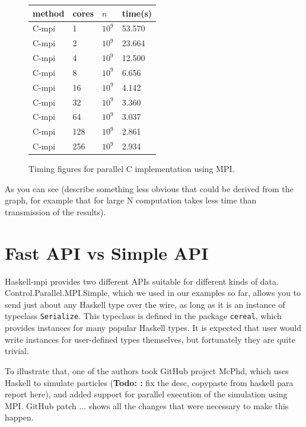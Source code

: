 \documentclass{tmr}
\newcommand{\Todo}[1]{{\textbf{Todo: #1}}}
\begin{document}
\begin{figure}
\begin{center}
\begin{tabular}{|l|l|l|l|} \hline
method & cores & $n$ & time(s) \\ \hline\hline
C-mpi & 1   & $10^9$ & 53.570 \\ \hline
C-mpi & 2   & $10^9$ & 23.664  \\ \hline
C-mpi & 4   & $10^9$ & 12.500 \\ \hline
C-mpi & 8   & $10^9$ & 6.656 \\ \hline
C-mpi & 16  & $10^9$ & 4.142 \\ \hline
C-mpi & 32 & $10^9$ & 3.360 \\ \hline
C-mpi & 64   & $10^9$ & 3.037 \\ \hline
C-mpi & 128   & $10^9$ & 2.861 \\ \hline
C-mpi & 256 & $10^9$ & 2.934 \\ \hline
\end{tabular}
\end{center}
\caption{Timing figures for parallel C implementation using MPI.\label{CTiminigTable}}
\end{figure}


As you can see (describe something less obvious that could be derived
from the graph, for example that for large N computation takes less
time than transmission of the results).

\section{Fast API vs Simple API}

Haskell-mpi provides two different APIs suitable for different kinds
of data. Control.Parallel.MPI.Simple, which we used in our examples so
far, allows you to send just about any Haskell type over the wire, as
long as it is an instance of typeclass \verb|Serialize|. This
typeclass is defined in the package \verb|cereal|, which provides
instances for many popular Haskell types. It is expected that user
would write instances for user-defined types themselves, but
fortunately they are quite trivial.

To illustrate that, one of the authors took GitHub project McPhd,
which uses Haskell to simulate particles (\Todo: fix the desc,
copypaste from haskell para report here), and added support for
parallel execution of the simulation using MPI. GitHub patch ... shows
all the changes that were necessary to make this happen.
\end{document}
